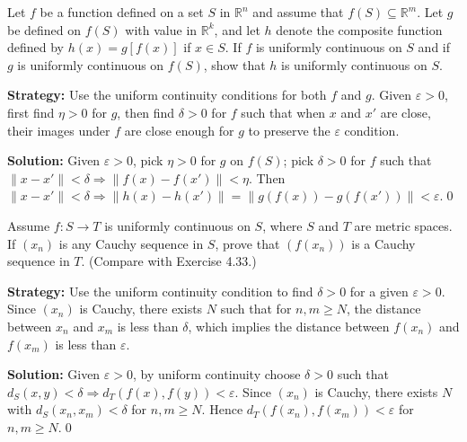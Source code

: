 \begin{problembox}
\begin{problemstatement}
Let $f$ be a function defined on a set $S$ in $\mathbb{R}^n$ and assume that $f(S) \subseteq \mathbb{R}^m$. Let $g$ be defined on $f(S)$ with value in $\mathbb{R}^k$, and let $h$ denote the composite function defined by $h(x) = g[f(x)]$ if $x \in S$. If $f$ is uniformly continuous on $S$ and if $g$ is uniformly continuous on $f(S)$, show that $h$ is uniformly continuous on $S$.
\end{problemstatement}
\end{problembox}

\noindent\textbf{Strategy:} Use the uniform continuity conditions for both $f$ and $g$. Given $\varepsilon > 0$, first find $\eta > 0$ for $g$, then find $\delta > 0$ for $f$ such that when $x$ and $x'$ are close, their images under $f$ are close enough for $g$ to preserve the $\varepsilon$ condition.

\bigskip\noindent\textbf{Solution:}
Given $\varepsilon>0$, pick $\eta>0$ for $g$ on $f(S)$; pick $\delta>0$ for $f$ such that $\|x-x'\|<\delta\Rightarrow \|f(x)-f(x')\|<\eta$. Then $\|x-x'\|<\delta\Rightarrow \|h(x)-h(x')\|=\|g(f(x))-g(f(x'))\|<\varepsilon$.\qed



\begin{problembox}
\begin{problemstatement}
Assume $f : S \to T$ is uniformly continuous on $S$, where $S$ and $T$ are metric spaces. If $(x_n)$ is any Cauchy sequence in $S$, prove that $(f(x_n))$ is a Cauchy sequence in $T$. (Compare with Exercise 4.33.)
\end{problemstatement}
\end{problembox}

\noindent\textbf{Strategy:} Use the uniform continuity condition to find $\delta > 0$ for a given $\varepsilon > 0$. Since $(x_n)$ is Cauchy, there exists $N$ such that for $n, m \geq N$, the distance between $x_n$ and $x_m$ is less than $\delta$, which implies the distance between $f(x_n)$ and $f(x_m)$ is less than $\varepsilon$.

\bigskip\noindent\textbf{Solution:}
Given $\varepsilon>0$, by uniform continuity choose $\delta>0$ such that $d_S(x,y)<\delta\Rightarrow d_T(f(x),f(y))<\varepsilon$. Since $(x_n)$ is Cauchy, there exists $N$ with $d_S(x_n,x_m)<\delta$ for $n,m\ge N$. Hence $d_T(f(x_n),f(x_m))<\varepsilon$ for $n,m\ge N$.\qed




